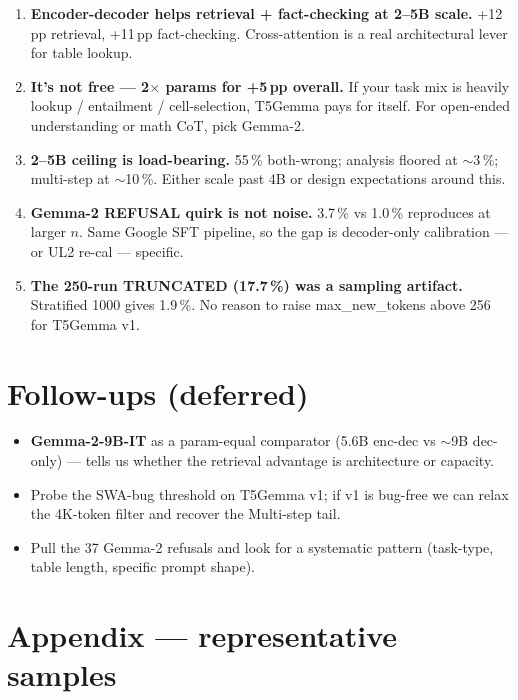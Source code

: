 \documentclass[11pt]{article}
\begin{document}
\begin{enumerate}
  \item \textbf{Encoder-decoder helps retrieval + fact-checking at 2--5B
        scale.} +12\,pp retrieval, +11\,pp fact-checking. Cross-attention
        is a real architectural lever for table lookup.
  \item \textbf{It's not free --- 2$\times$ params for +5\,pp overall.} If
        your task mix is heavily lookup / entailment / cell-selection,
        T5Gemma pays for itself. For open-ended understanding or math CoT,
        pick Gemma-2.
  \item \textbf{2--5B ceiling is load-bearing.} 55\,\% both-wrong; analysis
        floored at $\sim$3\,\%; multi-step at $\sim$10\,\%. Either scale
        past 4B or design expectations around this.
  \item \textbf{Gemma-2 REFUSAL quirk is not noise.} 3.7\,\% vs 1.0\,\%
        reproduces at larger $n$. Same Google SFT pipeline, so the gap is
        decoder-only calibration --- or UL2 re-cal --- specific.
  \item \textbf{The 250-run TRUNCATED (17.7\,\%) was a sampling artifact.}
        Stratified 1000 gives 1.9\,\%. No reason to raise
        max\_new\_tokens above 256 for T5Gemma v1.
\end{enumerate}

\section*{Follow-ups (deferred)}

\begin{itemize}
  \item \textbf{Gemma-2-9B-IT} as a param-equal comparator (5.6B enc-dec
        vs $\sim$9B dec-only) --- tells us whether the retrieval
        advantage is architecture or capacity.
  \item Probe the SWA-bug threshold on T5Gemma v1; if v1 is bug-free
        we can relax the 4K-token filter and recover the Multi-step tail.
  \item Pull the 37 Gemma-2 refusals and look for a systematic pattern
        (task-type, table length, specific prompt shape).
\end{itemize}

\section*{Appendix --- representative samples}
\end{document}
